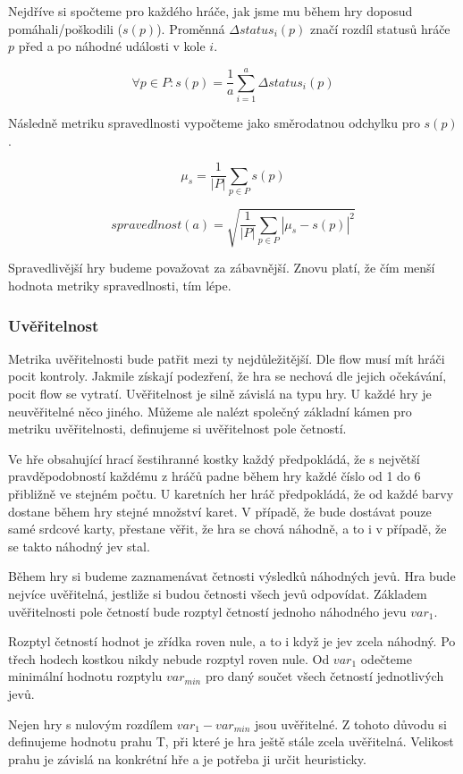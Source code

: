 Nejdříve si spočteme pro každého hráče, jak jsme mu během hry doposud pomáhali/poškodili ($s(p)$). Proměnná $\Delta status_i(p)$ značí rozdíl statusů hráče $p$ před a po náhodné události v kole $i$.

	\[
	\forall p \in P : s(p) = \frac{1}{a}\sum_{i=1}^a \Delta status_i(p)
\]

Následně metriku spravedlnosti vypočteme jako směrodatnou odchylku pro $s(p)$.

	\[
	\mu_s = \frac{1}{|P|}\sum_{p \in P} s(p)
\]

	\[
	spravedlnost(a) = \sqrt{\frac{1}{|P|}\sum_{p \in P} |\mu_s - s(p)|^2}
\]

Spravedlivější hry budeme považovat za zábavnější. Znovu platí, že čím menší hodnota metriky spravedlnosti, tím lépe.

\subsubsection{Uvěřitelnost}

Metrika uvěřitelnosti bude patřit mezi ty nejdůležitější. Dle flow musí mít hráči pocit kontroly. Jakmile získají podezření, že hra se nechová dle jejich očekávání, pocit flow se vytratí. Uvěřitelnost je silně závislá na typu hry. U každé hry je neuvěřitelné něco jiného. Můžeme ale nalézt společný základní kámen pro metriku uvěřitelnosti, definujeme si uvěřitelnost pole četností.

Ve hře obsahující hrací šestihranné kostky každý předpokládá, že s největší pravděpodobností každému z hráčů padne během hry každé číslo od 1 do 6 přibližně ve stejném počtu. U karetních her hráč předpokládá, že od každé barvy dostane během hry stejné množství karet. V případě, že bude dostávat pouze samé srdcové karty, přestane věřit, že hra se chová náhodně, a to i v případě, že se takto náhodný jev stal.

Během hry si budeme zaznamenávat četnosti výsledků náhodných jevů. Hra bude nejvíce uvěřitelná, jestliže si budou četnosti všech jevů odpovídat. Základem uvěřitelnosti pole četností bude rozptyl četností jednoho náhodného jevu $var_1$.

Rozptyl četností hodnot je zřídka roven nule, a to i když je jev zcela náhodný. Po třech hodech kostkou nikdy nebude rozptyl roven nule. Od $var_1$ odečteme minimální hodnotu rozptylu $var_{min}$ pro daný součet všech četností jednotlivých jevů.

Nejen hry s nulovým rozdílem $var_1 - var_{min}$ jsou uvěřitelné. Z tohoto důvodu si definujeme hodnotu prahu T, při které je hra ještě stále zcela uvěřitelná. Velikost prahu je závislá na konkrétní hře a je potřeba ji určit heuristicky.

